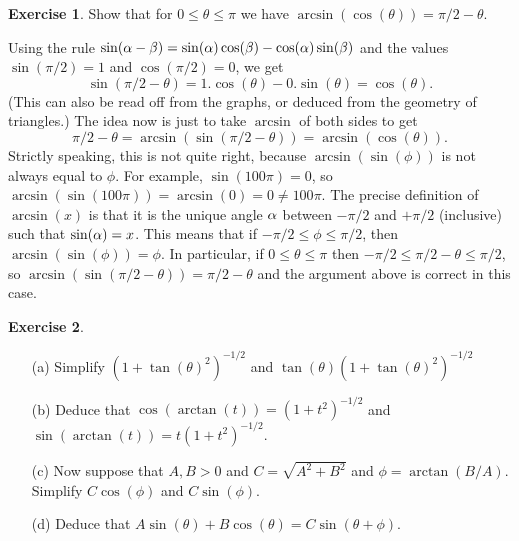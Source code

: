 \documentclass[a4paper]{amsart}
\theoremstyle{definition}
\newtheorem{exercise}{Exercise}[section]
\newenvironment{solution}{{\noindent \bf Solution:}}{}
\begin{document}
\begin{exercise}\label{ex-arcsincos}
Show that for $0\leq\theta\leq\pi$ we have
 $\arcsin(\cos(\theta))=\pi/2-\theta$.
\end{exercise}
\begin{solution}
Using the rule
 $\sin(\alpha-\beta)=\sin(\alpha)\cos(\beta)-\cos(\alpha)\sin(\beta)$ and
 the values $\sin(\pi/2)=1$ and $\cos(\pi/2)=0$, we get
 \[ \sin(\pi/2-\theta) = 1.\cos(\theta) - 0.\sin(\theta)
     = \cos(\theta).
 \]
 (This can also be read off from the graphs, or deduced from
 the geometry of triangles.)  The idea now is just to take
 $\arcsin$ of both sides to get 
 \[ \pi/2-\theta = \arcsin(\sin(\pi/2-\theta)) =
      \arcsin(\cos(\theta)).
 \]
 Strictly speaking, this is not quite right, because
 $\arcsin(\sin(\phi))$ is not always equal to $\phi$.  For
 example, $\sin(100\pi)=0$, so
 $\arcsin(\sin(100\pi))=\arcsin(0)=0\neq 100\pi$.  The
 precise definition of $\arcsin(x)$ is that it is the unique
 angle $\alpha$ between $-\pi/2$ and $+\pi/2$ (inclusive) such
 that $\sin(\alpha)=x$.  This means that if
 $-\pi/2\leq\phi\leq\pi/2$, then $\arcsin(\sin(\phi))=\phi$.
 In particular, if $0\leq\theta\leq\pi$ then
 $-\pi/2\leq\pi/2-\theta\leq\pi/2$, so
 $\arcsin(\sin(\pi/2-\theta))=\pi/2-\theta$ and the argument
 above is correct in this case.
\end{solution}
\begin{exercise}\label{ex-phase-shift}
\begin{itemize}
  \item[(a)] Simplify $(1+\tan(\theta)^2)^{-1/2}$ and
   $\tan(\theta)(1+\tan(\theta)^2)^{-1/2}$
  \item[(b)] Deduce that $\cos(\arctan(t))=(1+t^2)^{-1/2}$ and
   $\sin(\arctan(t))=t(1+t^2)^{-1/2}$.  
  \item[(c)] Now suppose that $A,B>0$ and $C=\sqrt{A^2+B^2}$ and
   $\phi=\arctan(B/A)$.  Simplify $C\cos(\phi)$ and
   $C\sin(\phi)$.
  \item[(d)] Deduce that
   $A\sin(\theta)+B\cos(\theta)=C\sin(\theta+\phi)$. 
 \end{itemize}
\end{exercise}
\end{document}
